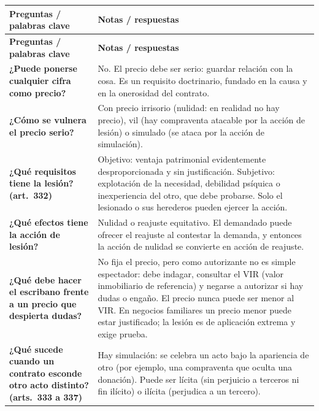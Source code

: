 \documentclass[12pt,oneside]{book}
\begin{document}
\begin{longtable}{@{}>{\raggedright\arraybackslash}p{}>{\raggedright\arraybackslash}p{}@{}}
\toprule
\textbf{Preguntas / palabras clave} & \textbf{Notas / respuestas} \\
\midrule
\endfirsthead
\toprule
\textbf{Preguntas / palabras clave} & \textbf{Notas / respuestas} \\
\midrule
\endhead
\bottomrule
\endfoot

\textbf{¿Puede ponerse cualquier cifra como precio?} &
No. El precio debe ser serio: guardar relaci\'on con la cosa. Es un requisito doctrinario, fundado en la causa y en la onerosidad del contrato. \\[0.8em]

\textbf{¿C\'omo se vulnera el precio serio?} &
Con precio irrisorio (nulidad: en realidad no hay precio), vil (hay compraventa atacable por la acci\'on de lesi\'on) o simulado (se ataca por la acci\'on de simulaci\'on). \\[0.8em]

\textbf{¿Qu\'e requisitos tiene la lesi\'on? (art.~332)} &
Objetivo: ventaja patrimonial evidentemente desproporcionada y sin justificaci\'on. Subjetivo: explotaci\'on de la necesidad, debilidad ps\'iquica o inexperiencia del otro, que debe probarse. Solo el lesionado o sus herederos pueden ejercer la acci\'on. \\[0.8em]

\textbf{¿Qu\'e efectos tiene la acci\'on de lesi\'on?} &
Nulidad o reajuste equitativo. El demandado puede ofrecer el reajuste al contestar la demanda, y entonces la acci\'on de nulidad se convierte en acci\'on de reajuste. \\[0.8em]

\textbf{¿Qu\'e debe hacer el escribano frente a un precio que despierta dudas?} &
No fija el precio, pero como autorizante no es simple espectador: debe indagar, consultar el VIR (valor inmobiliario de referencia) y negarse a autorizar si hay dudas o engaño. El precio nunca puede ser menor al VIR. En negocios familiares un precio menor puede estar justificado; la lesi\'on es de aplicaci\'on extrema y exige prueba. \\[0.8em]

\textbf{¿Qu\'e sucede cuando un contrato esconde otro acto distinto? (arts.~333 a 337)} &
Hay simulaci\'on: se celebra un acto bajo la apariencia de otro (por ejemplo, una compraventa que oculta una donaci\'on). Puede ser l\'icita (sin perjuicio a terceros ni fin il\'icito) o il\'icita (perjudica a un tercero). \\[0.8em]


\end{longtable}
\end{document}
